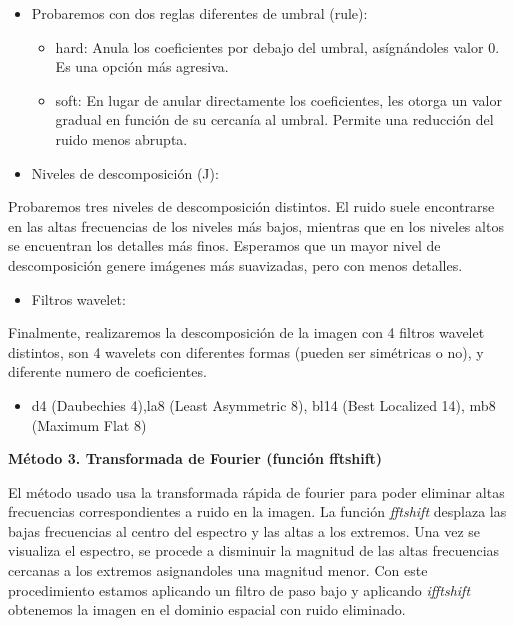 \documentclass[
]{article}
\providecommand{\tightlist}{%
  \setlength{\itemsep}{0pt}\setlength{\parskip}{0pt}}
\begin{document}
\begin{itemize}
\item
  Probaremos con dos reglas diferentes de umbral (rule):

  \begin{itemize}
  \tightlist
  \item
    hard: Anula los coeficientes por debajo del umbral, asígnándoles
    valor 0. Es una opción más agresiva.
  \item
    soft: En lugar de anular directamente los coeficientes, les otorga
    un valor gradual en función de su cercanía al umbral. Permite una
    reducción del ruido menos abrupta.
  \end{itemize}
\item
  Niveles de descomposición (J):
\end{itemize}

Probaremos tres niveles de descomposición distintos. El ruido suele
encontrarse en las altas frecuencias de los niveles más bajos, mientras
que en los niveles altos se encuentran los detalles más finos. Esperamos
que un mayor nivel de descomposición genere imágenes más suavizadas,
pero con menos detalles.

\begin{itemize}
\tightlist
\item
  Filtros wavelet:
\end{itemize}

Finalmente, realizaremos la descomposición de la imagen con 4 filtros
wavelet distintos, son 4 wavelets con diferentes formas (pueden ser
simétricas o no), y diferente numero de coeficientes.

\begin{itemize}
\tightlist
\item
  d4 (Daubechies 4),la8 (Least Asymmetric 8), bl14 (Best Localized 14),
  mb8 (Maximum Flat 8)
\end{itemize}

\textbf{Método 3. Transformada de Fourier (función fftshift)}

El método usado usa la transformada rápida de fourier para poder
eliminar altas frecuencias correspondientes a ruido en la imagen. La
función \emph{fftshift} desplaza las bajas frecuencias al centro del
espectro y las altas a los extremos. Una vez se visualiza el espectro,
se procede a disminuir la magnitud de las altas frecuencias cercanas a
los extremos asignandoles una magnitud menor. Con este procedimiento
estamos aplicando un filtro de paso bajo y aplicando \emph{ifftshift}
obtenemos la imagen en el dominio espacial con ruido eliminado.
\end{document}
